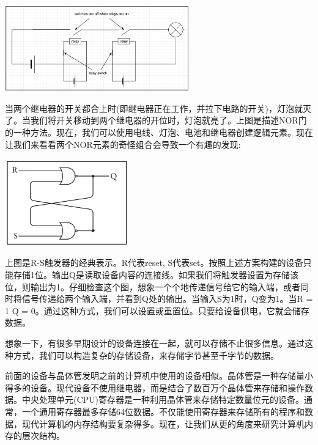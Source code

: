\begin{center}
	\includegraphics[width=0.6\textwidth]{content/Section-1/Chapter-5/3}
\end{center}

当两个继电器的开关都合上时(即继电器正在工作，并拉下电路的开关)，灯泡就灭了。当我们将开关移动到两个继电器的开位时，灯泡就亮了。上图是描述NOR门的一种方法。现在，我们可以使用电线、灯泡、电池和继电器创建逻辑元素。现在让我们来看看两个NOR元素的奇怪组合会导致一个有趣的发现: \par

\begin{center}
	\includegraphics[width=0.4\textwidth]{content/Section-1/Chapter-5/4}
\end{center}

上图是R-S触发器的经典表示。R代表reset, S代表set。按照上述方案构建的设备只能存储1位。输出Q是读取设备内容的连接线。如果我们将触发器设置为存储该位，则输出为1。仔细检查这个图，想象一个个地传递信号给它的输入端，或者同时将信号传递给两个输入端，并看到Q处的输出。当输入S为1时，Q变为1。当R = 1 Q = 0。通过这种方式，我们可以设置或重置位。只要给设备供电，它就会储存数据。 \par
想象一下，有很多早期设计的设备连接在一起，就可以存储不止很多信息。通过这种方式，我们可以构造复杂的存储设备，来存储字节甚至千字节的数据。 \par
前面的设备与晶体管发明之前的计算机中使用的设备相似。晶体管是一种存储量小得多的设备。现代设备不使用继电器，而是结合了数百万个晶体管来存储和操作数据。中央处理单元(CPU)寄存器是一种利用晶体管来存储特定数量位元的设备。通常，一个通用寄存器最多存储64位数据。不仅能使用寄存器来存储所有的程序和数据，现代计算机的内存结构要复杂得多。现在，让我们从更的角度来研究计算机内存的层次结构。 \par

